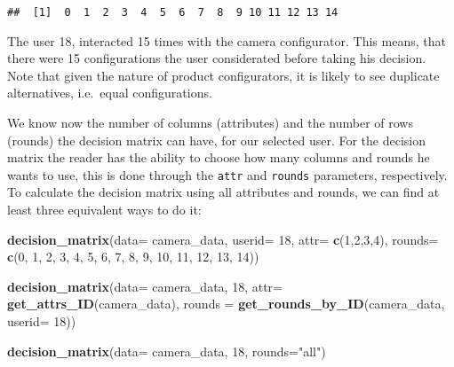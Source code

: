 \documentclass[]{article}
\newenvironment{Shaded}{\begin{snugshade}}{\end{snugshade}}
\newcommand{\KeywordTok}[1]{\textcolor[rgb]{0.13,0.29,0.53}{\textbf{{#1}}}}
\newcommand{\DataTypeTok}[1]{\textcolor[rgb]{0.13,0.29,0.53}{{#1}}}
\newcommand{\DecValTok}[1]{\textcolor[rgb]{0.00,0.00,0.81}{{#1}}}
\newcommand{\StringTok}[1]{\textcolor[rgb]{0.31,0.60,0.02}{{#1}}}
\newcommand{\NormalTok}[1]{{#1}}
\begin{document}
\begin{verbatim}
##  [1]  0  1  2  3  4  5  6  7  8  9 10 11 12 13 14
\end{verbatim}

The user 18, interacted 15 times with the camera configurator. This
means, that there were 15 configurations the user considerated before
taking his decision. Note that given the nature of product
configurators, it is likely to see duplicate alternatives, i.e.~equal
configurations.

We know now the number of columns (attributes) and the number of rows
(rounds) the decision matrix can have, for our selected user. For the
decision matrix the reader has the ability to choose how many columns
and rounds he wants to use, this is done through the \texttt{attr} and
\texttt{rounds} parameters, respectively. To calculate the decision
matrix using all attributes and rounds, we can find at least three
equivalent ways to do it:

\begin{Shaded}
\begin{Highlighting}[]
\KeywordTok{decision_matrix}\NormalTok{(}\DataTypeTok{data=} \NormalTok{camera_data, }\DataTypeTok{userid=} \DecValTok{18}\NormalTok{,  }\DataTypeTok{attr=} \KeywordTok{c}\NormalTok{(}\DecValTok{1}\NormalTok{,}\DecValTok{2}\NormalTok{,}\DecValTok{3}\NormalTok{,}\DecValTok{4}\NormalTok{), }
                \DataTypeTok{rounds=} \KeywordTok{c}\NormalTok{(}\DecValTok{0}\NormalTok{, }\DecValTok{1}\NormalTok{, }\DecValTok{2}\NormalTok{, }\DecValTok{3}\NormalTok{, }\DecValTok{4}\NormalTok{, }\DecValTok{5}\NormalTok{, }\DecValTok{6}\NormalTok{, }\DecValTok{7}\NormalTok{, }\DecValTok{8}\NormalTok{, }\DecValTok{9}\NormalTok{, }\DecValTok{10}\NormalTok{, }\DecValTok{11}\NormalTok{, }\DecValTok{12}\NormalTok{, }\DecValTok{13}\NormalTok{, }\DecValTok{14}\NormalTok{))}

\KeywordTok{decision_matrix}\NormalTok{(}\DataTypeTok{data=} \NormalTok{camera_data, }\DecValTok{18}\NormalTok{, }\DataTypeTok{attr=} \KeywordTok{get_attrs_ID}\NormalTok{(camera_data),}
                \DataTypeTok{rounds =} \KeywordTok{get_rounds_by_ID}\NormalTok{(camera_data, }\DataTypeTok{userid=} \DecValTok{18}\NormalTok{))}

\KeywordTok{decision_matrix}\NormalTok{(}\DataTypeTok{data=} \NormalTok{camera_data, }\DecValTok{18}\NormalTok{, }\DataTypeTok{rounds=}\StringTok{"all"}\NormalTok{)}
\end{Highlighting}
\end{Shaded}
\end{document}

